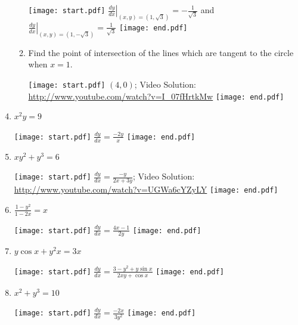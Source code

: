 \documentclass[12pt]{article}
\begin{document}
\begin{enumerate}
\begin{enumerate}
\texttt{[image: start.pdf]}
{{$\left.\frac{dy}{dx}\right|_{(x,y)=\left(1,\sqrt{3}\right)}=-\frac{1}{\sqrt{3}}$ and $\left.\frac{dy}{dx}\right|_{(x,y)=\left(1,-\sqrt{3}\right)}=\frac{1}{\sqrt{3}}$}}
\texttt{[image: end.pdf]}


\item Find the point of intersection of the lines which are tangent to the circle when $x=1$.

\texttt{[image: start.pdf]}
{{$(4,0)$; Video Solution: \href{http://www.youtube.com/watch?v=I_07fHrtkMw}{http://www.youtube.com/watch?v=I\_07fHrtkMw}}}
\texttt{[image: end.pdf]}


\end{enumerate}

\end{enumerate}


\begin{enumerate}
\setcounter{enumi}{3}

\item $x^2y=9$ 

\texttt{[image: start.pdf]}
{{$\frac{dy}{dx}=\frac{-2y}{x}$}}
\texttt{[image: end.pdf]}


\item $xy^2+y^3 = 6$ 

\texttt{[image: start.pdf]}
{{$\frac{dy}{dx}=\frac{-y}{2x+3y}$; Video Solution: \href{http://www.youtube.com/watch?v=UGWa6cYZyLY}{http://www.youtube.com/watch?v=UGWa6cYZyLY}}}
\texttt{[image: end.pdf]}


\item $\frac{1-y^2}{1-2x}=x$ 

\texttt{[image: start.pdf]}
{{$\frac{dy}{dx}=\frac{4x-1}{2y}$}}
\texttt{[image: end.pdf]}


\item $y\cos{x} + y^2x = 3x$ 

\texttt{[image: start.pdf]}
{{$\frac{dy}{dx}=\frac{3-y^2+y\sin{x}}{2xy+\cos{x}}$}}
\texttt{[image: end.pdf]}


\item $x^2+y^3=10$ 

\texttt{[image: start.pdf]}
{{$\frac{dy}{dx}=\frac{-2x}{3y^2}$}}
\texttt{[image: end.pdf]}


\end{enumerate}

\end{document}
